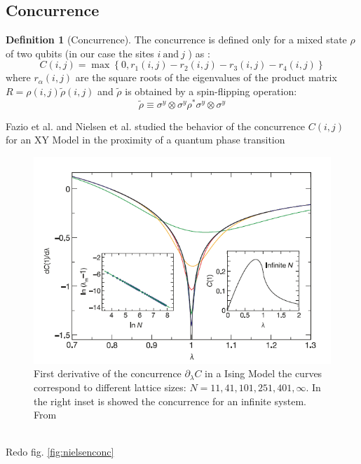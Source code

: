 \documentclass[12pt,a4paper]{book}
\theoremstyle{definition}
\newtheorem{definition}{Definition}[section]
\begin{document}
\subsection{Concurrence}
\begin{definition}[Concurrence]
	The concurrence is defined only for a mixed state $\rho$ of two qubits (in our case the sites $i \  \text{and} \  j$ ) as :
\begin{equation}
	C(i, j)=\max \left\{0, r_{1}(i, j)-r_{2}(i, j)-r_{3}(i, j)-r_{4}(i, j)\right\}
\end{equation}
where $r_\alpha (i, j)$ are the square roots of the eigenvalues of the product matrix $R = \rho (i, j) \tilde{\rho} (i, j)$ and $\tilde{\rho}$ is obtained by a spin-flipping operation:
\begin{equation}
	\tilde{\rho} \equiv \sigma^{y} \otimes \sigma^{y} \rho^{*} \sigma^{y} \otimes \sigma^{y}
\end{equation}
\end{definition}
\cite{Osterloh2002} Fazio et al. and  \cite{PhysRevA.66.032110} Nielsen et al. studied the behavior of the concurrence $C(i, j)$ for an XY Model in the proximity of a quantum phase transition
\begin{figure}[h]
	\centering
	\includegraphics[width=0.7\linewidth]{graphs/osterlohfazio}
	\caption{First derivative of the concurrence $\partial_{\lambda}C$ in a  Ising Model the curves
		correspond to different lattice sizes: $N=11, 41, 101, 251, 401,\infty$. In the right inset is showed the concurrence for an infinite system. From \cite{Osterloh2002}}
	\label{fig:osterlohfazio}
\end{figure}\\
Redo fig. \ref{fig:nielsenconc} 
\end{document}
